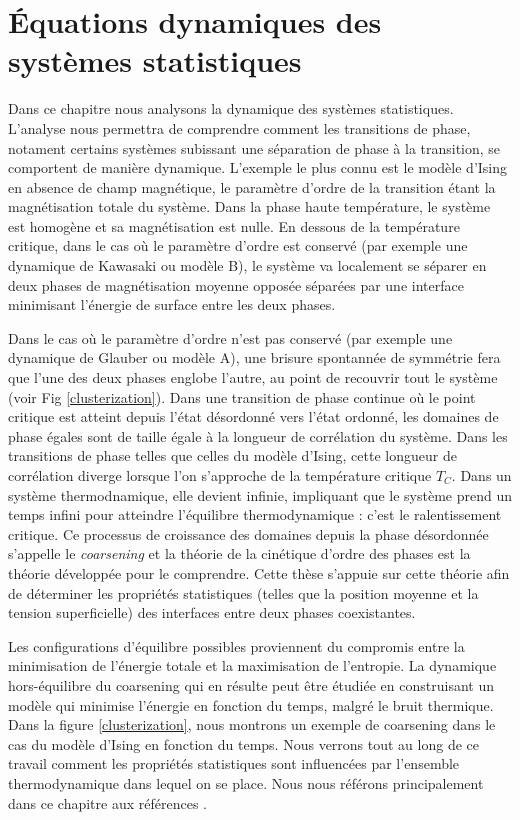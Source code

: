 \chapter{Équations dynamiques des systèmes statistiques}

Dans ce chapitre nous analysons la dynamique des systèmes statistiques. L'analyse nous permettra de comprendre comment les transitions de phase, notament certains systèmes subissant une séparation de phase à la transition, se comportent de manière dynamique. L'exemple le plus connu est le modèle d'Ising en absence de champ magnétique, le paramètre d'ordre de la transition étant la magnétisation totale du système. Dans la phase haute température, le système est homogène et sa magnétisation est nulle. En dessous de la température critique, dans le cas où le paramètre d'ordre est conservé (par exemple une dynamique de Kawasaki ou modèle B), le système va localement se séparer en deux phases de magnétisation moyenne opposée séparées par une interface minimisant l'énergie de surface entre les deux phases. 

Dans le cas où le paramètre d'ordre n'est pas conservé (par exemple une dynamique de Glauber ou modèle A), une brisure spontannée de symmétrie fera que l'une des deux phases englobe l'autre, au point de recouvrir tout le système (voir Fig \ref{clusterization}). Dans une transition de phase continue où le point critique est atteint depuis l'état désordonné vers l'état ordonné, les domaines de phase égales sont de taille égale à la longueur de corrélation du système. Dans les transitions de phase telles que celles du modèle d'Ising, cette longueur de corrélation diverge lorsque l'on s'approche de la température critique $T_C$. Dans un système thermodnamique, elle devient infinie, impliquant que le système prend un temps infini pour atteindre l'équilibre thermodynamique : c'est le ralentissement critique. Ce processus de croissance des domaines depuis la phase désordonnée s'appelle le \textit{coarsening} et la théorie de la cinétique d'ordre des phases est la théorie développée pour le comprendre.
Cette thèse s'appuie sur cette théorie afin de déterminer les propriétés statistiques (telles que la position moyenne et la tension superficielle) des interfaces entre deux phases coexistantes.

Les configurations d'équilibre possibles proviennent du compromis entre la minimisation de l'énergie totale et la maximisation de l'entropie. La dynamique hors-équilibre du coarsening qui en résulte peut être étudiée en construisant un modèle qui  minimise l'énergie en fonction du temps, malgré le bruit thermique. Dans la figure \ref{clusterization}, nous montrons un exemple de coarsening dans le cas du modèle d'Ising en fonction du temps. Nous verrons tout au long de ce travail comment les propriétés statistiques sont influencées par l'ensemble thermodynamique dans lequel on se place. Nous nous référons principalement dans ce chapitre aux références \cite{hohenberg_theory_1977,bray_theory_1994,krapivsky_kinetic_2010,halpin-healy_kinetic_1995}.

